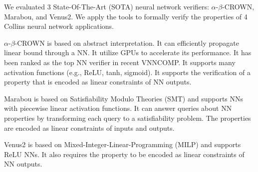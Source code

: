 We evaluated 3 State-Of-The-Art (SOTA) neural network verifiers: $\alpha$-$\beta$-CROWN, Marabou, and Venus2. We apply the tools to formally verify the properties of 4 Collins neural network applications.

$\alpha$-$\beta$-CROWN is based on abstract interpretation. It can efficiently propagate linear bound through a NN. It utilize GPUs to accelerate its performance. It has been ranked as the top NN verifier in recent VNNCOMP. It supports many activation functions (e.g., ReLU, tanh, sigmoid).
It supports the verification of a property that is encoded as linear constraints of NN outputs.

Marabou is based on Satisfiability Modulo Theories (SMT) and supports NNs with piecewise linear activation functions. It can answer queries about NN properties by transforming each query to a satisfiability problem. The properties are encoded as linear constraints of inputs and outputs.

Venus2 is based on Mixed-Integer-Linear-Programming (MILP) and supports ReLU NNs. It also requires the property to be encoded as linear constraints of NN outputs.